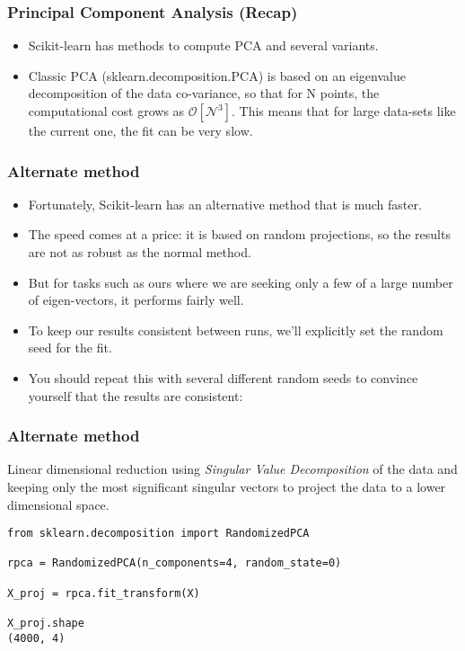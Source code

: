 




\begin{frame}[fragile]
\frametitle{Principal Component Analysis (Recap)}
\begin{itemize}
	\item Scikit-learn has methods to compute PCA and several variants. 
	\item Classic PCA (sklearn.decomposition.PCA) is based on an eigenvalue decomposition of the data co-variance, so that for N points, the computational cost grows as
	$\mathcal{O[N^3]}$. This means that for large data-sets like the current one, the fit can be very slow. 
\end{itemize}
\end{frame}

\begin{frame}[fragile]\frametitle{Alternate method}

\begin{itemize}
\item Fortunately, Scikit-learn has an alternative method that is much faster. 
\item The speed comes at a price: it is based on random projections, so the results are not as robust as the normal method. 
\item But for tasks such as ours where we are seeking only a few of a large number of eigen-vectors, it performs fairly well. 
\item To keep our results consistent between runs, we'll explicitly set the random seed for the fit. 
\item You should repeat this with several different random seeds to convince yourself that the results are consistent:
\end{itemize}
\end{frame}


\begin{frame}[fragile]\frametitle{Alternate method}

Linear dimensional reduction using \textit{Singular Value Decomposition} of the data and keeping only the most significant singular vectors to project the data to a lower dimensional space.

\begin{lstlisting}
from sklearn.decomposition import RandomizedPCA

rpca = RandomizedPCA(n_components=4, random_state=0)

X_proj = rpca.fit_transform(X)

X_proj.shape
(4000, 4)
\end{lstlisting}


\end{frame}

